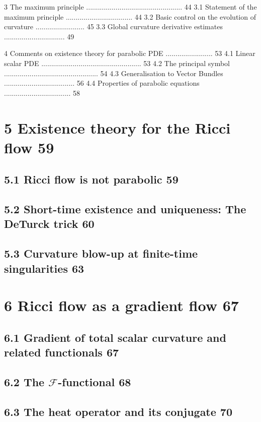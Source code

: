 3 The maximum principle ................................................. 44
3.1 Statement of the maximum principle .................................. 44
3.2 Basic control on the evolution of curvature ......................... 45
3.3 Global curvature derivative estimates ............................... 49

4 Comments on existence theory for parabolic PDE ........................ 53
4.1 Linear scalar PDE ................................................... 53
4.2 The principal symbol ................................................ 54
4.3 Generalisation to Vector Bundles .................................... 56
4.4 Properties of parabolic equations .................................. 58

\section*{5 \quad Existence theory for the Ricci flow \hfill 59}
\subsection*{5.1 \quad Ricci flow is not parabolic \hfill 59}
\subsection*{5.2 \quad Short-time existence and uniqueness: The DeTurck trick \hfill 60}
\subsection*{5.3 \quad Curvature blow-up at finite-time singularities \hfill 63}

\section*{6 \quad Ricci flow as a gradient flow \hfill 67}
\subsection*{6.1 \quad Gradient of total scalar curvature and related functionals \hfill 67}
\subsection*{6.2 \quad The $\mathcal{F}$-functional \hfill 68}
\subsection*{6.3 \quad The heat operator and its conjugate \hfill 70}
